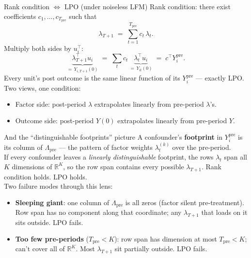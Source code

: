 \documentclass[xcolor=dvipsnames]{beamer}
\newcommand{\ypre}{Y^{\text{pre}}_i}      %
\newcommand{\Lpre}{\Lambda_{\text{pre}}}  %
\begin{document}
\begin{frame}{Rank condition $\Leftrightarrow$ LPO (under noiseless LFM)}
\small
Rank condition: there exist coefficients $c_1, \ldots, c_{T_{\text{pre}}}$ such that
\[
\lambda_{T+1} \;=\; \sum_{t=1}^{T_{\text{pre}}} c_t\, \lambda_t.
\]
 Multiply both sides by $u_i^\top$:
\[
\underbrace{\lambda_{T+1}^\top u_i}_{=\, Y_{i,T+1}(0)} \;=\; \sum_{t} c_t\, \underbrace{\lambda_t^\top u_i}_{=\, Y_{it}(0)} \;=\; c^\top\ypre.
\]
 Every unit's post outcome is the same linear function of its $\ypre$ --- exactly LPO.\\[1ex]
 Two views, one condition:
\begin{itemize}
  \item Factor side: post-period $\lambda$ extrapolates linearly from pre-period $\lambda$'s.
  \item Outcome side: post-period $Y(0)$ extrapolates linearly from pre-period $Y$.
\end{itemize}
\end{frame}

\begin{frame}{And the ``distinguishable footprints'' picture}
\small
A confounder's \textbf{footprint} in $\ypre$ is its column of $\Lpre$ --- the pattern of factor weights $\lambda_t^{(k)}$ over the pre-period.\\[1ex]
 If every confounder leaves a \emph{linearly distinguishable} footprint, the rows $\lambda_t$ span all $K$ dimensions of $\mathbb{R}^K$, so the row span contains every possible $\lambda_{T+1}$. Rank condition holds. LPO holds.\\[1ex]
 Two failure modes through this lens:
\begin{itemize}
  \item \textbf{Sleeping giant}: one column of $\Lpre$ is all zeros (factor silent pre-treatment). Row span has no component along that coordinate; any $\lambda_{T+1}$ that loads on it sits outside. LPO fails.
  \item \textbf{Too few pre-periods} ($T_{\text{pre}} < K$): row span has dimension at most $T_{\text{pre}} < K$; can't cover all of $\mathbb{R}^K$. Most $\lambda_{T+1}$ sit partially outside. LPO fails.
\end{itemize}
\end{frame}
\end{document}
